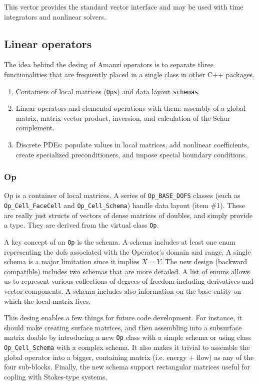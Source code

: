 This vector provides the standard vector interface and may be used with
time integrators and nonlinear solvers.


\subsection{Linear operators}
The idea behind the desing of Amanzi operators is to separate three 
functionalities that are frequently placed in a single class in other
C++ packages.

\begin{enumerate}
\item Containers of local matrices ({\tt Ops}) and data layout {\tt schemas}.

\item Linear operators and elemental operations with them: assembly of a global 
      matrix, matrix-vector product, inversion, and calculation of the Schur complement.

\item Discrete PDEs: populate values in local matrices, add nonlinear 
coefficients, create specialized preconditioners, and impose special
boundary conditions. 
\end{enumerate}


\subsubsection{Op}
Op is a container of local matrices.
A series of {\tt Op\_BASE\_DOFS} classes (such as {\tt Op\_Cell\_FaceCell} and 
{\tt Op\_Cell\_Schema}) handle data layout (item \#1). 
These are really just structs of vectors of
dense matrices of doubles, and simply provide a type.
They are derived from the virtual class {\tt Op}.

A key concept of an {\tt Op} is the schema. 
A schema includes at least one enum representing the dofs associated
with the Operator's domain and range. A single schema is a major limitation 
since it implies $X=Y$.
The new design (backward compatible) includes two schemas that are more 
detailed. A list of enums allows us to represent various collections of 
degrees of freedom including derivatives and vector components.
A schema includes also information on the base entity on which the local 
matrix lives.

This desing enables a few things for future code development.
For instance, it should make creating surface matrices, and then assembling into a 
subsurface matrix doable by introducing a new {\tt Op} class with a simple schema
or using class {\tt Op\_Cell\_Schema} with a complex schema. 
It also makes it trivial to assemble the global operator into a bigger, containing 
matrix (i.e. energy + flow) as any of the four sub-blocks.
Finally, the new schema support rectangular matrices useful for copling with 
Stokes-type systems.

